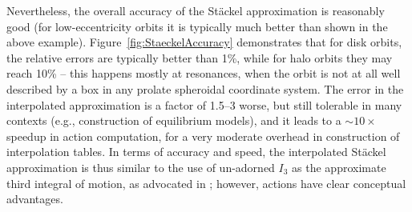 \documentclass[12pt]{article}
\begin{document}
Nevertheless, the overall accuracy of the St\"ackel approximation is reasonably good (for low-eccentricity orbits it is typically much better than shown in the above example). Figure~\ref{fig:StaeckelAccuracy} demonstrates that for disk orbits, the relative errors are typically better than 1\%, while for halo orbits they may reach 10\% -- this happens mostly at resonances, when the orbit is not at all well described by a box in any prolate spheroidal coordinate system. The error in the interpolated approximation is a factor of 1.5--3 worse, but still tolerable in many contexts (e.g., construction of equilibrium models), and it leads to a $\sim 10\times$ speedup in action computation, for a very moderate overhead in construction of interpolation tables. In terms of accuracy and speed, the interpolated St\"ackel approximation is thus similar to the use of un-adorned $I_3$ as the approximate third integral of motion, as advocated in \cite{Bienayme2015}; however, actions have clear conceptual advantages.
\end{document}

